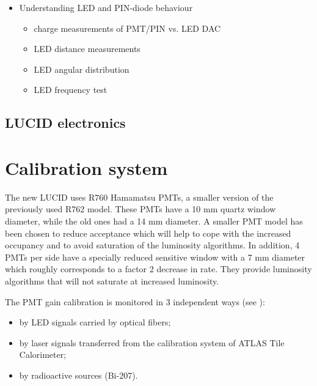    \begin{itemize}
         \item Understanding LED and PIN-diode behaviour
         \begin{itemize}
          \item charge measurements of PMT/PIN vs. LED DAC
           \item LED distance measurements  
          \item LED angular distribution
	  \item LED frequency test
         \end{itemize}
       \end{itemize}

\subsection{LUCID electronics}


\section{Calibration system}
The new LUCID uses R760 Hamamatsu PMTs, a smaller version of the previously used R762 model. These PMTs have a 
10 mm
quartz window diameter, while the old ones had a 14 mm diameter. A smaller PMT model has been chosen to reduce acceptance 
which will help to cope with the increased occupancy and to avoid saturation of the luminosity algorithms.
In addition, 4 PMTs per side have a specially reduced sensitive window with a 7 mm diameter which roughly 
corresponds to a factor 2 decrease in rate. They provide luminosity algorithms that will not saturate at 
increased luminosity.

The PMT gain calibration is monitored in 3 independent ways (see ):
\begin{itemize}
 \item by LED signals carried by optical fibers;
 \item by laser signals transferred from the calibration system of ATLAS Tile Calorimeter;
 \item by radioactive sources (Bi-207).
\end{itemize}

